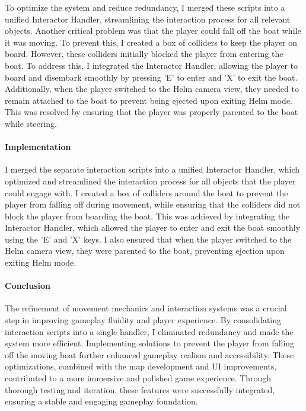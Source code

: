\documentclass{article}
\begin{document}
To optimize the system and reduce redundancy, I merged these scripts into a unified Interactor Handler, streamlining the interaction process for all relevant objects. Another critical problem was that the player could fall off the boat while it was moving. To prevent this, I created a box of colliders to keep the player on board. However, these colliders initially blocked the player from entering the boat. To address this, I integrated the Interactor Handler, allowing the player to board and disembark smoothly by pressing 'E' to enter and 'X' to exit the boat.
Additionally, when the player switched to the Helm camera view, they needed to remain attached to the boat to prevent being ejected upon exiting Helm mode. This was resolved by ensuring that the player was properly parented to the boat while steering.

\paragraph{Implementation}\hfill

I merged the separate interaction scripts into a unified Interactor Handler, which optimized and streamlined the interaction process for all objects that the player could engage with. I created a box of colliders around the boat to prevent the player from falling off during movement, while ensuring that the colliders did not block the player from boarding the boat. This was achieved by integrating the Interactor Handler, which allowed the player to enter and exit the boat smoothly using the 'E' and 'X' keys. I also ensured that when the player switched to the Helm camera view, they were parented to the boat, preventing ejection upon exiting Helm mode.

\paragraph{Conclusion}\hfill

The refinement of movement mechanics and interaction systems was a crucial step in improving gameplay fluidity and player experience. By consolidating interaction scripts into a single handler, I eliminated redundancy and made the system more efficient. Implementing solutions to prevent the player from falling off the moving boat further enhanced gameplay realism and accessibility. These optimizations, combined with the map development and UI improvements, contributed to a more immersive and polished game experience. Through thorough testing and iteration, these features were successfully integrated, ensuring a stable and engaging gameplay foundation.
\end{document}
